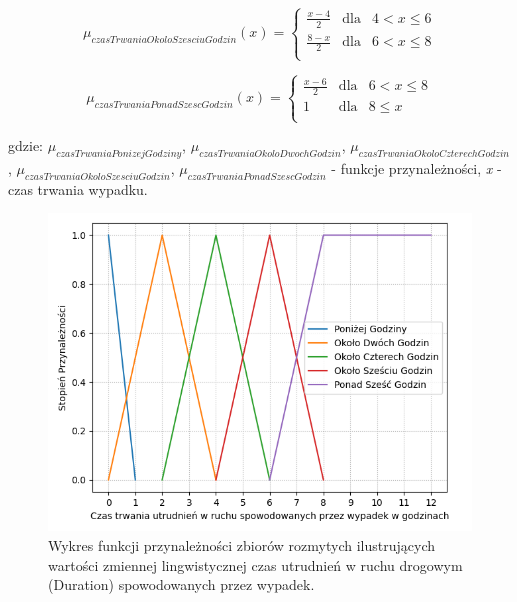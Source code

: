 \documentclass{classrep}
\begin{document}
\begin{equation}
\mu _{czasTrwaniaOkoloSzesciuGodzin}(x) = \left\{ \begin{array}{rcl}
\frac{x - 4}{2} & \mbox{dla} & 4 < x \leq 6\\
\frac{8 - x}{2} & \mbox{dla} & 6 < x \leq 8\\
\end{array}\right.
\end{equation}

\begin{equation}
\mu _{czasTrwaniaPonadSzescGodzin}(x) = \left\{ \begin{array}{rcl}
\frac{x - 6}{2} & \mbox{dla} & 6 < x \leq 8\\
1 & \mbox{dla} & 8 \leq x \\
\end{array}\right.
\end{equation}

gdzie: \(\mu _{czasTrwaniaPonizejGodziny}\), \(\mu _{czasTrwaniaOkoloDwochGodzin}\), \(\mu _{czasTrwaniaOkoloCzterechGodzin}\), \(\mu _{czasTrwaniaOkoloSzesciuGodzin}\), \(\mu _{czasTrwaniaPonadSzescGodzin}\) - funkcje przynależności, \textit{x} - czas trwania wypadku.
\begin{figure}[h!]
\centering
\includegraphics[width=14cm]{FunkcjaPrzynaleznosciCzasTrwania.png}
\vspace{-0.3cm}
\caption{Wykres funkcji przynależności zbiorów rozmytych ilustrujących wartości zmiennej lingwistycznej czas utrudnień w ruchu drogowym (Duration) spowodowanych przez wypadek. }
\label{rysunek do eksperymentu 1 wariantu 1}
\end{figure}
\newpage
\end{document}
